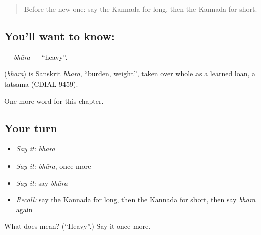 \label{lesson:KA-C140-bhara}



\begin{quote}
Before the new one: say the Kannada for long, then the Kannada for short.
\end{quote}

\subsection*{You'll want to know: }
\textbf{} — \emph{bhāra} — \textquotedblleft{}heavy\textquotedblright{}.

\begin{cousinweb}
\textbf{} (\emph{bhāra}) is Sanskrit \emph{bhāra}, \textquotedblleft{}burden, weight\textquotedblright{}, taken over whole as a learned loan, a tatsama (CDIAL 9459).
\end{cousinweb}

\begin{grammarlens}[title={What you've built}]
One more word for this chapter.
\end{grammarlens}

\subsection*{Your turn}
\begin{itemize}
\raggedright
  \item \emph{Say it:} \emph{bhāra}
  \item \emph{Say it:} \emph{bhāra}, once more
  \item \emph{Say it:} say \emph{bhāra}
  \item \emph{Recall:} say the Kannada for long, then the Kannada for short, then say \emph{bhāra} again
\end{itemize}

\begin{tcolorbox}[breakable,colback=teal!4,colframe=teal!35!black,title={Before you move on}]
What does  mean? (\textquotedblleft{}Heavy\textquotedblright{}.) Say it once more.
\end{tcolorbox}
